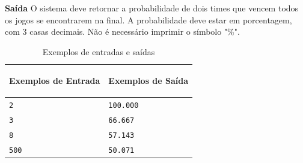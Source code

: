 \vspace{0.3cm}
\textbf{Saída}
O sistema deve retornar a probabilidade de dois times que vencem todos os jogos se encontrarem na final. A probabilidade deve estar em porcentagem, com 3 casas decimais. Não é necessário imprimir o símbolo "\%". 

\begin{table}[h]
    \centering
    \begin{tabular}{|p{7cm}|p{7cm}|}
        \hline
        \begin{center}
            \vspace{-0.3cm}
            \textbf{Exemplos de Entrada}
            \vspace{-0.3cm}
        \end{center} 
         &  
        \begin{center}
            \vspace{-0.3cm}
            \textbf{Exemplos de Saída}
            \vspace{-0.3cm}
        \end{center} \\ \hline
         \texttt{2} & \texttt{100.000} \\  
         \hline
         \texttt{3} & \texttt{66.667} \\ 
         \hline
         \texttt{8} & \texttt{57.143} \\ 
         \hline
         \texttt{500} & \texttt{50.071} \\ 
         \hline
    \end{tabular}
    \caption{Exemplos de entradas e saídas}
    \label{tab:inputJ2}
\end{table}

\newpage

\begin{center}
\noindent

\end{center}